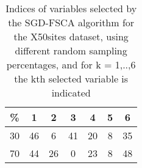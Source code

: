 \begin{table}
	\begin{center}
		\begin{tabular}{c c c c c c c}
			\% & 1 & 2 & 3 & 4 & 5 & 6 \\
			\hline
			30 & 46 & 6 & 41 & 20 & 8 & 35 \\
			70 & 44 & 26 & 0 & 23 & 8 & 48 \\
		\end{tabular}
	\end{center}
	\caption{Indices of variables selected by the SGD-FSCA algorithm for the X50sites dataset, using different random sampling percentages, and for k = 1,..,6 the kth selected variable is indicated}
\end{table}